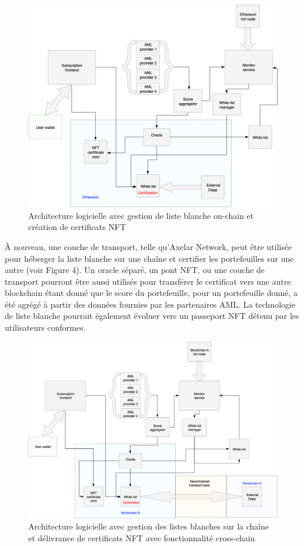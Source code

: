 ﻿\documentclass[a4paper]{article}
\begin{document}
\begin{figure}[!h]
\centering
\includegraphics[scale=0.35]{architecture_v2_trim.png}
\caption{Architecture logicielle avec gestion de liste blanche on-chain et création de certificats NFT}
\label{onchain}
\end{figure}

À nouveau, une couche de transport, telle qu'Axelar Network, peut être utilisée pour héberger la liste blanche sur une chaîne et certifier les portefeuilles sur une autre (voir Figure 4).
Un oracle séparé, un pont NFT, ou une couche de transport pourront être aussi utilisés pour transférer le certificat vers une autre blockchain étant donné que le score du portefeuille, pour un portefeuille donné, a été agrégé à partir des données fournies par les partenaires AML. La technologie de liste blanche pourrait également évoluer vers un passeport NFT détenu par les utilisateurs conformes. \\
  
\begin{figure}[!h]
\centering
\includegraphics[scale=0.35]{architecture_v2_crosschain_trim.png}
\caption{Architecture logicielle avec gestion des listes blanches sur la chaîne et délivrance de certificats NFT avec fonctionnalité cross-chain}
\label{onchain}
\end{figure}
\end{document}
